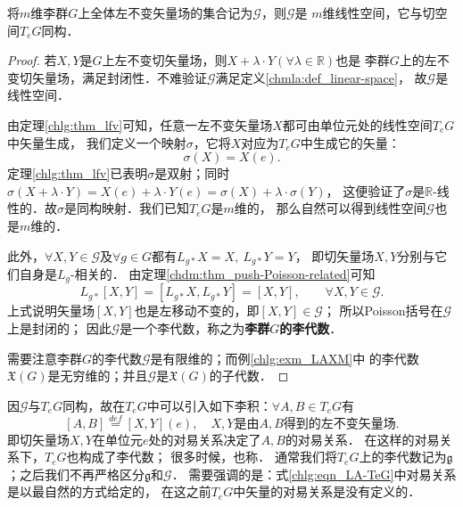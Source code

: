\begin{theorem}\label{chlg:thm_lfvls}
    将$m$维李群$G$上全体左不变矢量场的集合记为$\mathscr{G}$，则$\mathscr{G}$是
    $m$维线性空间，它与切空间$T_eG$同构．
\end{theorem}
\begin{proof}
    若$X,Y$是$G$上左不变切矢量场，则$X+\lambda\cdot Y(\forall \lambda \in \mathbb{R})$也是
    李群$G$上的左不变切矢量场，满足封闭性．不难验证$\mathscr{G}$满足定义\ref{chmla:def_linear-space}，
    故$\mathscr{G}$是线性空间．
    
    由定理\ref{chlg:thm_lfv}可知，任意一左不变矢量场$X$都可由单位元处的线性空间$T_eG$中矢量生成，
    我们定义一个映射$\sigma$，它将$X$对应为$T_eG$中生成它的矢量：
    \begin{equation}
        \sigma (X) = X(e).
    \end{equation}
    定理\ref{chlg:thm_lfv}已表明$\sigma$是双射；同时$\sigma (X+\lambda \cdot Y)
    = X(e)+\lambda\cdot Y(e)=\sigma(X)+\lambda\cdot\sigma(Y)$，
    这便验证了$\sigma$是$\mathbb{R}$-线性的．故$\sigma$是同构映射．我们已知$T_eG$是$m$维的，
    那么自然可以得到线性空间$\mathscr{G}$也是$m$维的．
    
    此外，$\forall X,Y\in \mathscr{G}$及$\forall g\in G$都有$L_{g*}X=X,\ L_{g*}Y=Y$，
    即切矢量场$X,Y$分别与它们自身是$L_g$-相关的．
    由定理\ref{chdm:thm_push-Poisson-related}可知  %
    \begin{equation}\label{chlg:eqn_LgXY}
        L_{g*}[X,Y]=[L_{g*}X, L_{g*}Y]=[X,Y], \qquad \forall X,Y \in \mathscr{G}.
    \end{equation}
    上式说明矢量场$[X,Y]$也是左移动不变的，即$[X,Y]\in \mathscr{G}$；
    所以Poisson括号在$\mathscr{G}$上是封闭的；
    因此$\mathscr{G}$是一个李代数，称之为{\heiti \bfseries 李群$G$的李代数}．
    
    需要注意李群$G$的李代数$\mathscr{G}$是有限维的；而例\ref{chlg:exm_LAXM}中
    的李代数$\mathfrak{X}(G)$是无穷维的；并且$\mathscr{G}$是$\mathfrak{X}(G)$的子代数．
\end{proof}


因$\mathscr{G}$与$T_eG$同构，故在$T_eG$中可以引入如下李积：$\forall A, B \in T_eG$有
\begin{equation}\label{chlg:eqn_LA-TeG}
    [A, B] \overset{def}{=} [X,Y](e), \quad 
    X,Y \text{是由}A,B \text{得到的左不变矢量场}.
\end{equation}
即切矢量场$X,Y$在单位元$e$处的对易关系决定了$A, B$的对易关系．
在这样的对易关系下，$T_eG$也构成了李代数；
很多时候，也称．
通常我们将$T_eG$上的李代数记为$\mathfrak{g}$；之后我们不再严格区分$\mathfrak{g}$和$\mathscr{G}$．
需要强调的是：式\eqref{chlg:eqn_LA-TeG}中对易关系是以最自然的方式给定的，
在这之前$T_eG$中矢量的对易关系是没有定义的．

